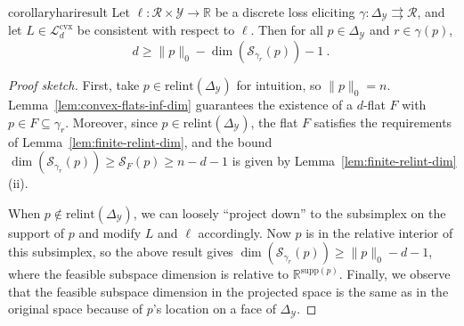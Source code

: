 \documentclass[anon,12pt]{colt2021} %
\newcommand{\Comments}{1}
\newcommand{\mynote}[2]{\ifnum\Comments=1\textcolor{#1}{#2}\fi}
\newcommand{\mytodo}[2]{\ifnum\Comments=1%
	\todo[linecolor=#1!80!black,backgroundcolor=#1,bordercolor=#1!80!black]{#2}\fi}
\newcommand{\jessiet}[1]{\mytodo{purple!20!white}{JF: #1}}
\newcommand{\bo}[1]{\mynote{blue}{[Bo: #1]}}
\newcommand{\btw}[1]{\mytodo{orange!80!white}{BTW: #1}}
\newcommand{\reals}{\mathbb{R}}
\newcommand{\simplex}{\Delta_\Y}
\newcommand{\relint}[1]{\mathrm{relint}(#1)}
\newcommand{\ccdim}{\mathrm{cc\,dim}}
\newcommand{\supp}{\mathrm{supp}}
\newcommand{\codim}{\mathrm{codim}}
\newcommand{\Lcvx}{\mathcal{L}^{\text{cvx}}}
\newcommand{\R}{\mathcal{R}}
\newcommand{\Sc}{\mathcal{S}}  %
\newcommand{\Scr}{\mathcal{S}}  %
\newcommand{\Y}{\mathcal{Y}}
\newcommand{\toto}{\rightrightarrows}
\begin{document}
\begin{restatable}{corollary}{hariresult}\label{cor:fsd-bound}
	Let $\ell:\R \times \Y \to \reals$ be a discrete loss eliciting $\gamma:\simplex \toto \R$, and let $L \in \Lcvx_d$ be consistent with respect to $\ell$.
	Then for all $p \in \simplex$ and $r \in \gamma(p)$,
	\begin{equation}
	  d \geq \|p\|_0 - \dim(\Sc_{\gamma_r}(p)) - 1~.~
	\end{equation}
\end{restatable}
\begin{proof}[Proof sketch]
	First, take $p \in \relint{\simplex}$ for intuition, so $\|p\|_0 = n$.
	Lemma~\ref{lem:convex-flats-inf-dim} guarantees the existence of a $d$-flat $F$ with $p \in F \subseteq \gamma_r$.
	Moreover, since $p \in \relint{\simplex}$, the flat $F$ satisfies the requirements of Lemma~\ref{lem:finite-relint-dim}, and the bound $\dim(\Sc_{\gamma_r}(p)) \geq \Scr_F(p) \geq n - d- 1$ is given by Lemma~\ref{lem:finite-relint-dim} (ii).

	When $p \not \in \relint{\simplex}$, we can loosely ``project down'' to the subsimplex on the support of $p$ and modify $L$ and $\ell$ accordingly.
	Now $p$ is in the relative interior of this subsimplex, so the above result gives $\dim(\Sc_{\gamma_r}(p)) \geq \|p\|_0 - d - 1$, where the feasible subspace dimension is relative to $\reals^{\supp(p)}$.
	Finally, we observe that the feasible subspace dimension in the projected space is the same as in the original space because of $p$'s location on a face of $\simplex$.
\end{proof}
\end{document}
